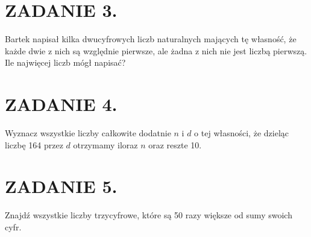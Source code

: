 \documentclass[10pt]{article}
\begin{document}
\section*{ZADANIE 3.}
Bartek napisał kilka dwucyfrowych liczb naturalnych mających tę własność, że każde dwie z nich są względnie pierwsze, ale żadna z nich nie jest liczbą pierwszą. Ile najwięcej liczb mógł napisać?

\section*{ZADANIE 4.}
Wyznacz wszystkie liczby całkowite dodatnie \(n\) i \(d\) o tej własności, że dzieląc liczbę 164 przez \(d\) otrzymamy iloraz \(n\) oraz reszte 10.

\section*{ZADANIE 5.}
Znajdź wszystkie liczby trzycyfrowe, które są 50 razy większe od sumy swoich cyfr.
\end{document}
